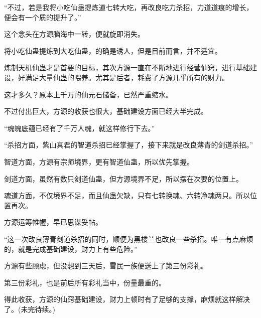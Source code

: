 \begin{this_body}
“不过，若是我将小吃仙蛊提炼道七转大吃，再改良吃力杀招，力道道痕的增长，便会有一个质的提升了。”

这个念头在方源脑海中一转，便就旋即消失。

将小吃仙蛊提炼到大吃仙蛊，的确是诱人，但是目前而言，并不适宜。

炼制天机仙蛊才是首要的目标，其次方源一直在不断地进行经营仙窍，进行基础建设，好满足大量仙蛊的喂养。尤其是后者，耗费了方源几乎所有的财力。

这才多久？原本上千万的仙元石储备，已然严重缩水。

不过付出巨大，方源的收获也很大，基础建设方面已经大半完成。

“魂魄底蕴已经有了千万人魂，就这样修行下去。”

“杀招方面，紫山真君的智道杀招已经掌握了，接下来就是改良薄青的剑道杀招。”

智道方面，方源有宗师境界，更有智道仙蛊，所以优先掌握。

剑道方面，虽然有数只剑道仙蛊，但方源境界不足，所以摆在次要的位置上。

魂道方面，不仅境界不足，而且仙蛊欠缺，只有七转换魂、六转净魂两只。所以位置再次。

方源运筹帷幄，早已思谋妥帖。

“这一次改良薄青剑道杀招的同时，顺便为黑楼兰也改良一些杀招。唯一有点麻烦的，就是完成基础建设，财力上有些危险。”

方源有些顾虑，但没想到三天后，雪民一族便送上了第三份彩礼。

第三份彩礼，也是前后所有彩礼当中，份量最重的。

得此收获，方源的仙窍基础建设，财力上顿时有了足够的支撑，麻烦就这样解决了。(未完待续。)

\end{this_body}

